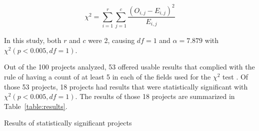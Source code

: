 \begin{equation}
    \label{equation:statistic}
\chi^2= \sum_{i=1}^{r} \sum_{j=1}^{c} \frac{(O_{i,j} - E_{i,j})^2}{E_{i,j}}
\end{equation}

In this study, both $r$ and $c$ were 2, causing $df = 1$ and $\alpha = 7.879$ with $\chi^2(p<0.005, df=1)$.

Out of the 100 projects analyzed, 53 offered usable results that complied with the rule of having a count of at least 5 in each of the fields used for the $\chi^2$ test \cite[p.104]{chi2016springer}. Of those 53 projects, 18 projects had results that were statistically significant with $\chi^2(p<0.005, df=1)$. The results of those 18 projects are summarized in Table~\ref{table:results}.


\begin{table}[!t]
         \renewcommand{\arraystretch}{1.3}
         \caption{Results of statistically significant projects}
         \label{table:results}
         \centering


\end{table}
